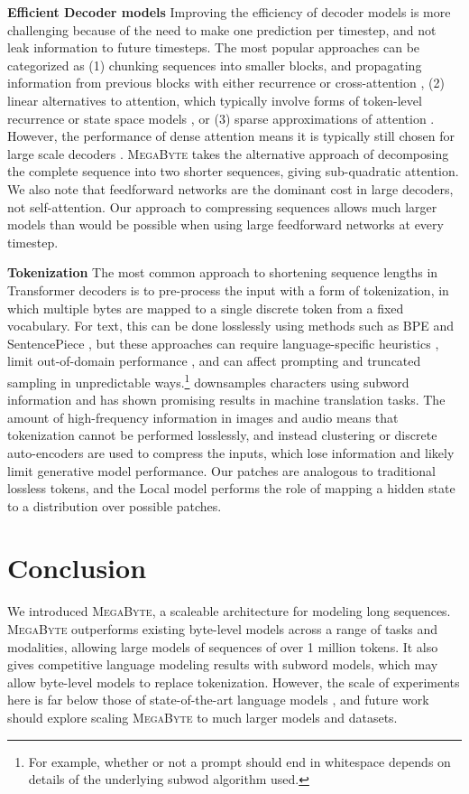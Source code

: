 \textbf{Efficient Decoder models} Improving the efficiency of decoder models is more challenging because of the need to make one prediction per timestep, and not leak information to future timesteps. The most popular approaches can be categorized as (1) chunking sequences into smaller blocks, and propagating information from previous blocks with either recurrence \citep{xfmxl,blockrecurrent} or cross-attention \citep{perceiverar}, (2) linear alternatives to attention, which typically involve forms of token-level recurrence \citep{lineartransformer, linear} or state space models \citep{s4,s5,mega}, or (3) sparse approximations of attention \citep{reformer,longformer,sparsetransformer,memorizing}. However, the performance of dense attention means it is typically still chosen for large scale decoders \citep{llama,palm}. \textsc{MegaByte} takes the alternative approach of decomposing the complete sequence into two shorter sequences, giving sub-quadratic attention. We also note that feedforward networks are the dominant cost in large decoders, not self-attention. Our approach to compressing sequences allows much larger models than would be possible when using large feedforward networks at every timestep.

\textbf{Tokenization} The most common approach to shortening sequence lengths in Transformer decoders is to pre-process the input with a form of tokenization, in which multiple bytes are mapped to a single discrete token from a fixed vocabulary. For text, this can be done losslessly using methods such as BPE \citep{bpe} and SentencePiece \citep{sentencepiece}, but these approaches can require language-specific heuristics \citep{gpt2}, limit out-of-domain performance \citep{sharami2023systematic}, and can affect prompting and truncated sampling in unpredictable ways.\footnote{For example, whether or not a prompt should end in whitespace depends on details of the underlying subwod algorithm used.} \citet{subword} downsamples characters using subword information and has shown promising results in machine translation tasks. The amount of high-frequency information in images and audio means that tokenization cannot be performed losslessly, and instead clustering \citep{hubert} or discrete auto-encoders \citep{dalle} are used to compress the inputs, which lose information and likely limit generative model performance. Our patches are analogous to traditional lossless tokens, and the Local model performs the role of mapping a hidden state to a distribution over possible patches.

\section{Conclusion}
We introduced \textsc{MegaByte}, a scaleable architecture for modeling long sequences.
\textsc{MegaByte} outperforms existing byte-level models across a range of tasks and modalities, allowing large models of sequences of over 1 million tokens. It also gives competitive language modeling results with subword models, which may allow byte-level models to replace tokenization. However, the scale of experiments here is far below those of state-of-the-art language models \citep{gpt3}, and future work should explore scaling \textsc{MegaByte} to much larger models and datasets.


